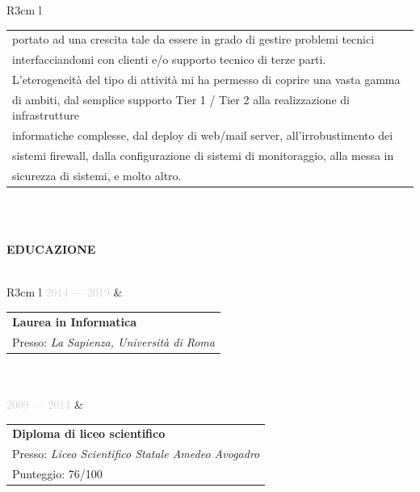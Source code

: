 \documentclass{article}
\begin{document}
\begin{tabular}{ R{3cm} l }
\begin{tabular}[l]{@{}l@{}}
		portato ad una crescita tale da essere in grado di gestire problemi tecnici \\
		interfacciandomi con clienti e/o supporto tecnico di terze parti. \\
		L'eterogeneità del tipo di attivit\`a mi ha permesso di coprire una vasta gamma \\
		di ambiti, dal semplice supporto Tier 1 / Tier 2 alla realizzazione di infrastrutture \\
		informatiche complesse, dal deploy di web/mail server, all'irrobustimento dei \\
		sistemi firewall, dalla configurazione di sistemi di monitoraggio, alla messa in \\
		sicurezza di sistemi, e molto altro.
		\end{tabular} \\\\ \hfill
\end{tabular}

\textbf{\textcolor{deepblue}{EDUCAZIONE}} \\\\ \hfill
\begin{tabular}{ R{3cm} l }
	\textcolor{lightgray}{2014 — 2019} & \begin{tabular}[l]{@{}l@{}}
	\textbf{Laurea in Informatica} \\
	Presso: \textit{La Sapienza, Universit\`a di Roma} \\
\end{tabular} \\\\ \hfill
\textcolor{lightgray}{2009 — 2014}  & \begin{tabular}[l]{@{}l@{}}
\textbf{Diploma di liceo scientifico} \\
Presso: \textit{Liceo Scientifico Statale Amedeo Avogadro} \\
Punteggio: 76/100
\end{tabular} \\\\ \hfill
\end{tabular}

\newpage
\end{document}
